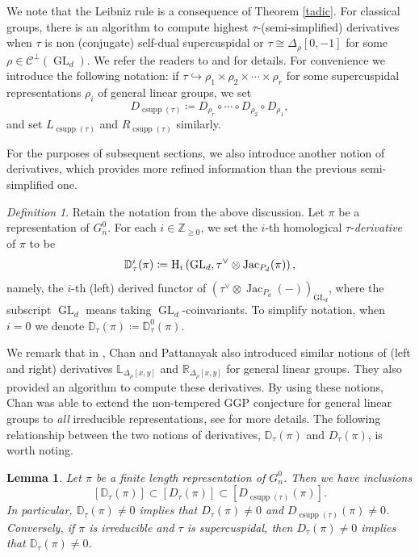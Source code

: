 \documentclass[11pt,letterpaper]{amsart}
\theoremstyle{plain}
\newcounter{theorem}[section]
\numberwithin{theorem}{section}
\numberwithin{equation}{subsection}
\newtheorem{Lem}[theorem]{Lemma}
\theoremstyle{remark}
\newtheorem{Def}[theorem]{Definition}
\newcommand{\GL}{\operatorname{GL}}
\newcommand{\Jac}{\operatorname{Jac}}
\newcommand{\csupp}{\operatorname{csupp}} %
\newcommand{\D}{\mathbb{D}}
\newcommand{\Z}{\mathbb{Z}}
\def\calC{\mathcal{C}}
\begin{document}
We note that the Leibniz rule is a consequence of Theorem \ref{tadic}. For classical groups, there is an algorithm to compute highest $\tau$-(semi-simplified) derivatives when $\tau$ is non (conjugate) self-dual supercuspidal or $\tau\cong \Delta_\rho[0,-1]$ for some $\rho\in\calC^\perp(\GL_d)$. We refer the readers to \cite{MR4549708} and \cite{clw26} for details. For convenience we introduce the following notation: if $\tau\hookrightarrow \rho_1\times\rho_2\times\cdots\times\rho_r$ for some supercuspidal representations $\rho_i$ of general linear groups, we set
\[
    D_{\csupp(\tau)} \coloneqq D_{\rho_r}\circ \cdots \circ D_{\rho_2}\circ D_{\rho_1},
\]
and set $L_{\csupp(\tau)}$ and $R_{\csupp(\tau)}$ similarly.

\vskip 5pt

For the purposes of subsequent sections, we also introduce another notion of derivatives, which provides more refined information than the previous semi-simplified one.

\begin{Def}
Retain the notation from the above discussion. Let $\pi$ be a representation of $G^0_n$. For each $i\in\Z_{\geq 0}$, we set the $i$-th homological $\tau$-\emph{derivative} of $\pi$ to be
\[
    \D^i_\tau (\pi) \coloneqq {\rm H}_i\left(\GL_d,\tau^\vee\otimes \Jac_{P_d}(\pi)\right),
\] 
namely, the $i$-th (left) derived functor of $\left(\tau^\vee\otimes \Jac_{P_d}(-)\right)_{\GL_d}$, where the subscript $\GL_d$ means taking $\GL_d$-coinvariants. To simplify notation, when $i=0$ we denote $\D_\tau(\pi) \coloneqq \D_\tau^0(\pi)$.
\end{Def}

\vskip 5pt

We remark that in \cite{chan2026}, Chan and Pattanayak also introduced similar notions of (left and right) derivatives $\mathbb{L}_{\Delta_{\rho}[x,y]}$ and $\mathbb{R}_{\Delta_{\rho}[x,y]}$ for general linear groups. They also provided an algorithm to compute these derivatives. By using these notions, Chan was able to extend the non-tempered GGP conjecture for general linear groups to \emph{all} irreducible representations, see \cite{chan2022quotient} for more details. The following relationship between the two notions of derivatives, $\D_\tau(\pi)$ and $D_\tau(\pi)$, is worth noting.

\begin{Lem}
Let $\pi$ be a finite length representation of $G^0_n$. Then we have inclusions 
\[
    \left[\D_\tau(\pi)\right] \subset \left[D_\tau(\pi)\right] \subset \left[D_{\csupp(\tau)}(\pi)\right].
\]
In particular, $\D_\tau(\pi)\neq 0$ implies that $D_\tau(\pi)\neq 0$ and $D_{\csupp(\tau)}(\pi)\neq 0$. Conversely, if $\pi$ is irreducible and $\tau$ is supercuspidal, then $D_\tau(\pi)\neq 0$ implies that $\D_\tau(\pi)\neq 0$.   
\end{Lem}
\end{document}
